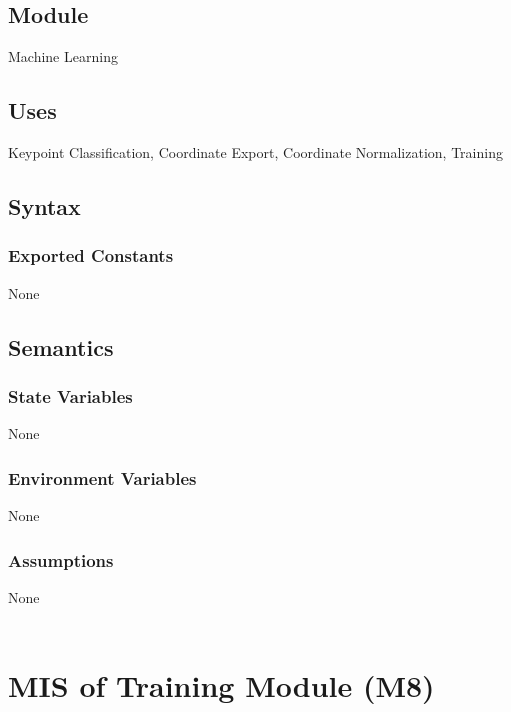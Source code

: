 \documentclass[12pt, titlepage]{article}
\begin{document}
\subsection{Module}

Machine Learning\\

\subsection{Uses}

Keypoint Classification, Coordinate Export, Coordinate Normalization, Training\\

\subsection{Syntax}

\subsubsection{Exported Constants}

None\\

\subsection{Semantics}

\subsubsection{State Variables}

None\\

\subsubsection{Environment Variables}

None\\

\subsubsection{Assumptions}

None\\

\newpage
~\newpage

\section{MIS of Training Module (M8)} \label{M8}
\end{document}
